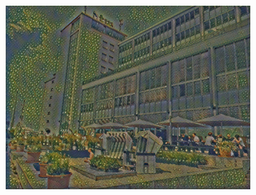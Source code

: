 \begin{figure}[H]
\begin{subfigure}[h]{0.32\textwidth}
        \includegraphics[width=\textwidth]{resources/content/experiments/htw-vgg16_portrait_of_joseph_roulin.jpg}
    \end{subfigure}



\end{figure}
